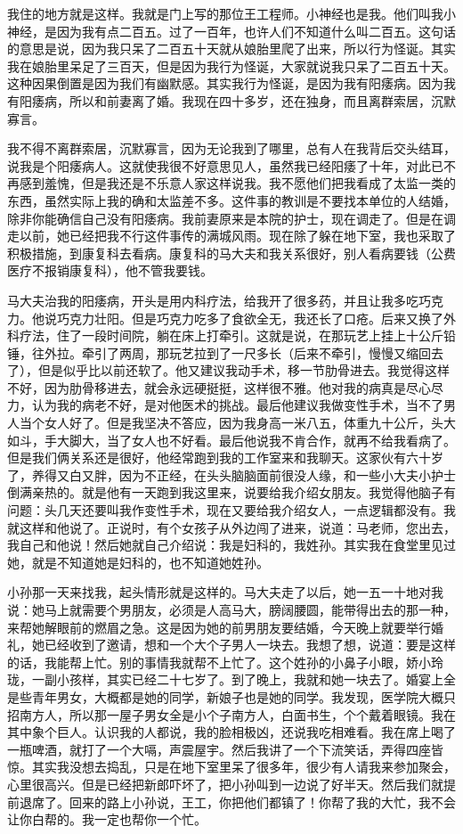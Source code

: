 我住的地方就是这样。我就是门上写的那位王工程师。小神经也是我。他们叫我小神经，是因为我有点二百五。过了一百年，也许人们不知道什么叫二百五。这句话的意思是说，因为我只呆了二百五十天就从娘胎里爬了出来，所以行为怪诞。其实我在娘胎里呆足了三百天，但是因为我行为怪诞，大家就说我只呆了二百五十天。这种因果倒置是因为我们有幽默感。其实我行为怪诞，是因为我有阳痿病。因为我有阳痿病，所以和前妻离了婚。我现在四十多岁，还在独身，而且离群索居，沉默寡言。 

我不得不离群索居，沉默寡言，因为无论我到了哪里，总有人在我背后交头结耳，说我是个阳痿病人。这就使我很不好意思见人，虽然我已经阳痿了十年，对此已不再感到羞愧，但是我还是不乐意人家这样说我。我不愿他们把我看成了太监一类的东西，虽然实际上我的确和太监差不多。这件事的教训是不要找本单位的人结婚，除非你能确信自己没有阳痿病。我前妻原来是本院的护士，现在调走了。但是在调走以前，她已经把我不行这件事传的满城风雨。现在除了躲在地下室，我也采取了积极措施，到康复科去看病。康复科的马大夫和我关系很好，别人看病要钱（公费医疗不报销康复科），他不管我要钱。 

马大夫治我的阳痿病，开头是用内科疗法，给我开了很多药，并且让我多吃巧克力。他说巧克力壮阳。但是巧克力吃多了食欲全无，我还长了口疮。后来又换了外科疗法，住了一段时间院，躺在床上打牵引。这就是说，在那玩艺上挂上十公斤铅锤，往外拉。牵引了两周，那玩艺拉到了一尺多长（后来不牵引，慢慢又缩回去了），但是似乎比以前还软了。他又建议我动手术，移一节肋骨进去。我觉得这样不好，因为肋骨移进去，就会永远硬挺挺，这样很不雅。他对我的病真是尽心尽力，认为我的病老不好，是对他医术的挑战。最后他建议我做变性手术，当不了男人当个女人好了。但是我坚决不答应，因为我身高一米八五，体重九十公斤，头大如斗，手大脚大，当了女人也不好看。最后他说我不肯合作，就再不给我看病了。但是我们俩关系还是很好，他经常跑到我的工作室来和我聊天。这家伙有六十岁了，养得又白又胖，因为不正经，在头头脑脑面前很没人缘，和一些小大夫小护士倒满亲热的。就是他有一天跑到我这里来，说要给我介绍女朋友。我觉得他脑子有问题：头几天还要叫我作变性手术，现在又要给我介绍女人，一点逻辑都没有。我就这样和他说了。正说时，有个女孩子从外边闯了进来，说道：马老师，您出去，我自己和他说！然后她就自己介绍说：我是妇科的，我姓孙。其实我在食堂里见过她，就是不知道她是妇科的，也不知道她姓孙。 

小孙那一天来找我，起头情形就是这样的。马大夫走了以后，她一五一十地对我说：她马上就需要个男朋友，必须是人高马大，膀阔腰圆，能带得出去的那一种，来帮她解眼前的燃眉之急。这是因为她的前男朋友要结婚，今天晚上就要举行婚礼，她已经收到了邀请，想和一个大个子男人一块去。我想了想，说道：要是这样的话，我能帮上忙。别的事情我就帮不上忙了。这个姓孙的小鼻子小眼，娇小玲珑，一副小孩样，其实已经二十七岁了。到了晚上，我就和她一块去了。婚宴上全是些青年男女，大概都是她的同学，新娘子也是她的同学。我发现，医学院大概只招南方人，所以那一屋子男女全是小个子南方人，白面书生，个个戴着眼镜。我在其中象个巨人。认识我的人都说，我的脸相极凶，还说我吃相难看。我在席上喝了一瓶啤酒，就打了一个大嗝，声震屋宇。然后我讲了一个下流笑话，弄得四座皆惊。其实我没想去捣乱，只是在地下室里呆了很多年，很少有人请我来参加聚会，心里很高兴。但是已经把新郎吓坏了，把小孙叫到一边说了好半天。然后我们就提前退席了。回来的路上小孙说，王工，你把他们都镇了！你帮了我的大忙，我不会让你白帮的。我一定也帮你一个忙。 



